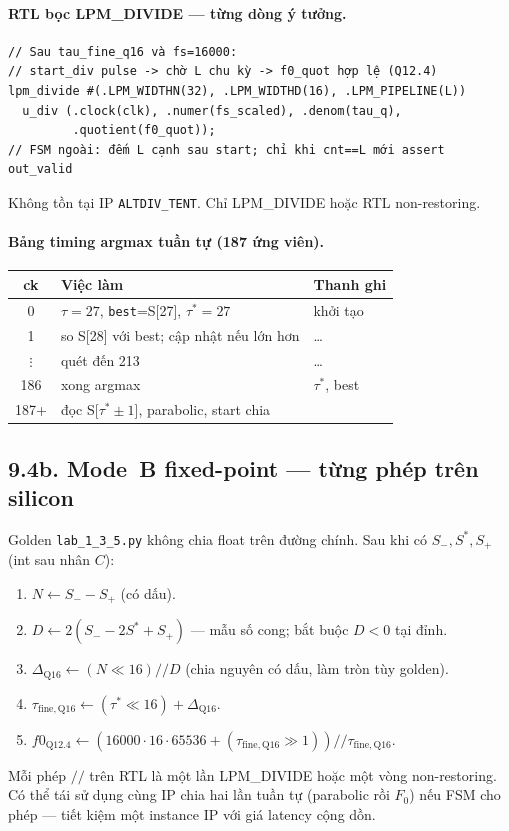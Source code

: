 \paragraph{RTL bọc LPM\_DIVIDE --- từng dòng ý tưởng.}
\begin{verbatim}
// Sau tau_fine_q16 và fs=16000:
// start_div pulse -> chờ L chu kỳ -> f0_quot hợp lệ (Q12.4)
lpm_divide #(.LPM_WIDTHN(32), .LPM_WIDTHD(16), .LPM_PIPELINE(L))
  u_div (.clock(clk), .numer(fs_scaled), .denom(tau_q),
         .quotient(f0_quot));
// FSM ngoài: đếm L cạnh sau start; chỉ khi cnt==L mới assert out_valid
\end{verbatim}
Không tồn tại IP \texttt{ALTDIV\_TENT}. Chỉ LPM\_DIVIDE hoặc RTL non-restoring.

\paragraph{Bảng timing argmax tuần tự (187 ứng viên).}
\begin{center}\small
\begin{tabular}{@{}cll@{}}\toprule
ck & Việc làm & Thanh ghi \\
\midrule
0 & $\tau=27$, \texttt{best}=S[27], $\tau^*=27$ & khởi tạo \\
1 & so S[28] với best; cập nhật nếu lớn hơn & \ldots \\
$\vdots$ & quét đến 213 & \ldots \\
186 & xong argmax & $\tau^*$, best \\
187+ & đọc S[$\tau^*{\pm}1$], parabolic, start chia & \\
\bottomrule
\end{tabular}
\end{center}


\subsection*{9.4b. Mode~B fixed-point --- từng phép trên silicon}

Golden \texttt{lab\_1\_3\_5.py} không chia float trên đường chính. Sau khi có $S_{-},S^{*},S_{+}$ (int sau nhân $C$):

\begin{enumerate}[leftmargin=1.4em]
\item $N \leftarrow S_{-} - S_{+}$ (có dấu).
\item $D \leftarrow 2(S_{-} - 2S^{*} + S_{+})$ --- mẫu số cong; bắt buộc $D < 0$ tại đỉnh.
\item $\Delta_{\mathrm{Q16}} \leftarrow (N \ll 16) // D$ (chia nguyên có dấu, làm tròn tùy golden).
\item $\tau_{\mathrm{fine,Q16}} \leftarrow (\tau^{*} \ll 16) + \Delta_{\mathrm{Q16}}$.
\item $f0_{\mathrm{Q12.4}} \leftarrow (16000\cdot 16\cdot 65536 + (\tau_{\mathrm{fine,Q16}}\gg 1)) // \tau_{\mathrm{fine,Q16}}$.
\end{enumerate}
Mỗi phép $//$ trên RTL là một lần LPM\_DIVIDE hoặc một vòng non-restoring. Có thể tái sử dụng cùng IP chia hai lần tuần tự (parabolic rồi $F_0$) nếu FSM cho phép --- tiết kiệm một instance IP với giá latency cộng dồn.

